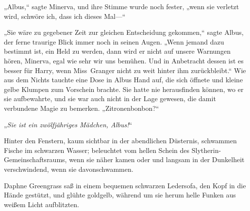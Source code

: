 „Albus,“ sagte Minerva, und ihre Stimme wurde noch fester, „wenn sie verletzt wird, schwöre ich, dass ich dieses Mal—“

„Sie wäre zu gegebener Zeit zur gleichen Entscheidung gekommen,“ sagte Albus, der ferne traurige Blick immer noch in seinen Augen. „Wenn jemand dazu bestimmt ist, ein Held zu werden, dann wird er nicht auf unsere Warnungen hören, Minerva, egal wie sehr wir uns bemühen. Und in Anbetracht dessen ist es besser für Harry, wenn Miss~Granger nicht zu weit hinter ihm zurückbleibt.“ Wie aus dem Nichts tauchte eine Dose in Albus Hand auf, die sich öffnete und kleine gelbe Klumpen zum Vorschein brachte. Sie hatte nie herausfinden können, wo er sie aufbewahrte, und sie war auch nicht in der Lage gewesen, die damit verbundene Magie zu bemerken. „Zitronenbonbon?“

„\emph{Sie ist ein zwölfjähriges Mädchen, Albus!}“


Hinter den Fenstern, kaum sichtbar in der abendlichen Düsternis, schwammen Fische im schwarzen Wasser; beleuchtet vom hellen Schein des Slytherin-Gemeinschaftsraums, wenn sie näher kamen oder und langsam in der Dunkelheit verschwindend, wenn sie davonschwammen.

Daphne Greengrass saß in einem bequemen schwarzen Ledersofa, den Kopf in die Hände gestützt, und glühte goldgelb, während um sie herum helle Funken aus weißem Licht aufblitzten.

